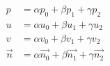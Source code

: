 \documentclass{article}
\begin{document}
\thispagestyle{empty}

\begin{align*}
      p &= \alpha p_0        + \beta p_1       + \gamma p_2 \\
      u &= \alpha u_0        + \beta u_1       + \gamma u_2 \\
      v &= \alpha v_0        + \beta v_1       + \gamma v_2 \\
\vec{n} &= \alpha \vec{n_0}  + \beta \vec{n_1} + \gamma \vec{n_2}
\end{align*}
\end{document}

